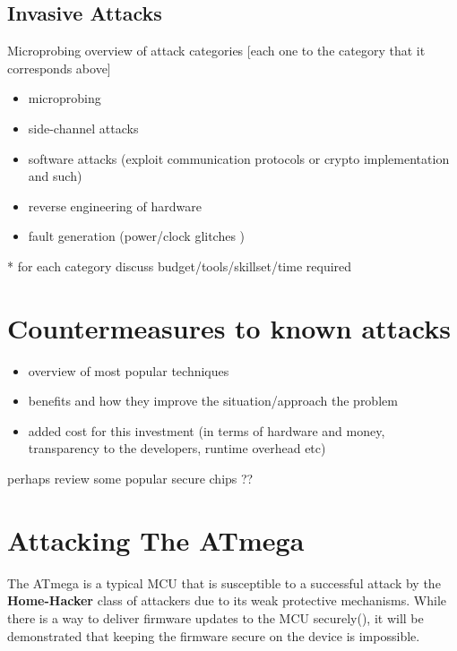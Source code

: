 \documentclass[10pt,a4paper,twocolumn]{article}
\begin{document}
	\subsection{Invasive Attacks}
	Microprobing
	overview of attack categories [each one to the category that it corresponds above]
	\begin{itemize}
		\item microprobing \\
		\item side-channel attacks \\
		\item software attacks (exploit communication protocols or crypto implementation and such) \\
		\item reverse engineering of hardware\\
		\item fault generation (power/clock glitches ) \\
	\end{itemize}
	
	* for each category discuss budget/tools/skillset/time required\\

\section{Countermeasures to known attacks}
\label{sec:defenses}
	\begin{itemize}
	\item overview of most popular techniques \\
	\item benefits and how they improve the situation/approach the problem
	\item added cost for this investment (in terms of hardware and money, transparency to the developers, runtime overhead etc)\\
	\end{itemize}
	
	perhaps review some popular secure chips ??	
	
	

\section{Attacking The ATmega}
\label{sec:attacking_mega}

The ATmega is a typical MCU that is susceptible to a successful attack by the \textbf{Home-Hacker} class of attackers due to its weak protective mechanisms. While there is a way to deliver firmware updates to the MCU securely(\citep{tech:aes_bls}), it will be demonstrated that keeping the firmware secure on the device is impossible.
\end{document}
